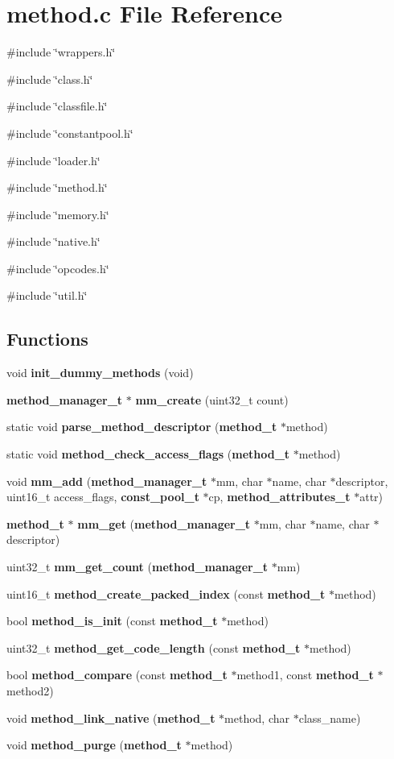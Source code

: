 \section{method.c File Reference}
\label{method_8c}
{\ttfamily \#include \char`\"{}wrappers.h\char`\"{}}\par
{\ttfamily \#include \char`\"{}class.h\char`\"{}}\par
{\ttfamily \#include \char`\"{}classfile.h\char`\"{}}\par
{\ttfamily \#include \char`\"{}constantpool.h\char`\"{}}\par
{\ttfamily \#include \char`\"{}loader.h\char`\"{}}\par
{\ttfamily \#include \char`\"{}method.h\char`\"{}}\par
{\ttfamily \#include \char`\"{}memory.h\char`\"{}}\par
{\ttfamily \#include \char`\"{}native.h\char`\"{}}\par
{\ttfamily \#include \char`\"{}opcodes.h\char`\"{}}\par
{\ttfamily \#include \char`\"{}util.h\char`\"{}}\par
\subsection*{Functions}
\begin{DoxyCompactItemize}
\item 
void {\bf init\_\-dummy\_\-methods} (void)
\item 
{\bf method\_\-manager\_\-t} $\ast$ {\bf mm\_\-create} (uint32\_\-t count)
\item 
static void {\bf parse\_\-method\_\-descriptor} ({\bf method\_\-t} $\ast$method)
\item 
static void {\bf method\_\-check\_\-access\_\-flags} ({\bf method\_\-t} $\ast$method)
\item 
void {\bf mm\_\-add} ({\bf method\_\-manager\_\-t} $\ast$mm, char $\ast$name, char $\ast$descriptor, uint16\_\-t access\_\-flags, {\bf const\_\-pool\_\-t} $\ast$cp, {\bf method\_\-attributes\_\-t} $\ast$attr)
\item 
{\bf method\_\-t} $\ast$ {\bf mm\_\-get} ({\bf method\_\-manager\_\-t} $\ast$mm, char $\ast$name, char $\ast$descriptor)
\item 
uint32\_\-t {\bf mm\_\-get\_\-count} ({\bf method\_\-manager\_\-t} $\ast$mm)
\item 
uint16\_\-t {\bf method\_\-create\_\-packed\_\-index} (const {\bf method\_\-t} $\ast$method)
\item 
bool {\bf method\_\-is\_\-init} (const {\bf method\_\-t} $\ast$method)
\item 
uint32\_\-t {\bf method\_\-get\_\-code\_\-length} (const {\bf method\_\-t} $\ast$method)
\item 
bool {\bf method\_\-compare} (const {\bf method\_\-t} $\ast$method1, const {\bf method\_\-t} $\ast$method2)
\item 
void {\bf method\_\-link\_\-native} ({\bf method\_\-t} $\ast$method, char $\ast$class\_\-name)
\item 
void {\bf method\_\-purge} ({\bf method\_\-t} $\ast$method)
\end{DoxyCompactItemize}
